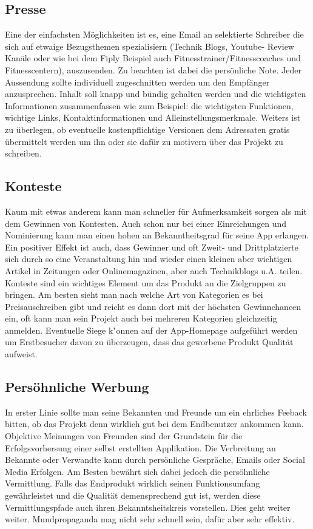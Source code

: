 \documentclass[FIPLY_base.tex]{subfiles}
\begin{document}
\subsection{Presse}
Eine der einfachsten Möglichkeiten ist es, eine Email an selektierte Schreiber die sich auf etwaige Bezugsthemen spezialisiern (Technik Blogs, Youtube- Review Kanäle oder wie bei dem Fiply Beispiel auch Fitnesstrainer/Fitnesscoaches und Fitnesscentern), auszusenden. Zu beachten ist dabei die persönliche Note. Jeder Aussendung sollte individuell zugeschnitten werden um den Empfänger anzusprechen. Inhalt soll knapp und bündig gehalten werden und die wichtigsten Informationen zusammenfassen wie zum Beispiel: die wichtigsten Funktionen, wichtige Links, Kontaktinformationen und Alleinstellungsmerkmale. Weiters ist zu überlegen, ob eventuelle kostenpflichtige Versionen dem Adressaten gratis übermittelt werden um ihn oder sie dafür zu motivern über das Projekt zu schreiben. 

\subsection{Konteste}
Kaum mit etwas anderem kann man schneller für Aufmerksamkeit sorgen als mit dem Gewinnen von Kontesten. Auch schon nur bei einer Einreichungen und Nominierung kann man einen hohen an Bekanntheitsgrad für seine App erlangen. Ein positiver Effekt ist auch, dass Gewinner und oft Zweit- und Drittplatzierte sich durch so eine Veranstaltung hin und wieder einen kleinen aber wichtigen Artikel in Zeitungen oder Onlinemagazinen, aber auch Technikblogs u.A. teilen. Konteste sind ein wichtiges Element um das Produkt an die Zielgruppen zu bringen. Am besten sieht man nach welche Art von Kategorien es bei Preisauschreiben gibt und reicht es dann dort mit der höchsten Gewinnchancen ein, oft kann man sein Projekt auch bei mehreren Kategorien gleichzeitig anmelden. 
\newline
Eventuelle Siege k"onnen auf der App-Homepage aufgeführt werden um Erstbesucher davon zu überzeugen, dass das geworbene Produkt Qualität aufweist.

\subsection{Persöhnliche Werbung}
In erster Linie sollte man seine Bekannten und Freunde um ein ehrliches Feeback bitten, ob das Projekt denn wirklich gut bei dem Endbenutzer ankommen kann. Objektive Meinungen von Freunden sind der Grundstein für die Erfolgsvorhersung einer selbst erstellten Applikation. Die Verbreitung an Bekannte oder Verwandte kann durch persönliche Gespräche, Emails oder Social Media Erfolgen. Am Besten bewährt sich dabei jedoch die persöhnliche Vermittlung. Falls das Endprodukt wirklich seinen Funktionsumfang gewährleistet und die Qualität demensprechend gut ist, werden diese Vermittlungspfade auch ihren Bekanntsheitskreis vorstellen. Dies geht weiter weiter. Mundpropaganda mag nicht sehr schnell sein, dafür aber sehr effektiv.
\end{document}
